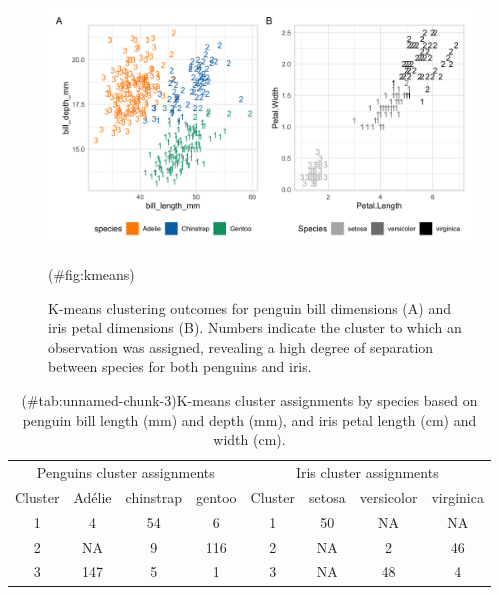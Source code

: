 \begin{Schunk}
\begin{figure}[htbp]

{\centering \includegraphics[width=6in]{fig/kmeans} 

}

\caption[K-means clustering outcomes for penguin bill dimensions (A) and iris petal dimensions (B)]{K-means clustering outcomes for penguin bill dimensions (A) and iris petal dimensions (B). Numbers indicate the cluster to which an observation was assigned, revealing a high degree of separation between species for both penguins and iris.}(\#fig:kmeans)
\end{figure}
\end{Schunk}

\begin{Schunk}
\begin{table}

\caption{(\#tab:unnamed-chunk-3)K-means cluster assignments by species based on penguin bill length (mm) and depth (mm), and iris petal length (cm) and width (cm).}
\centering
\begin{tabular}[t]{c|c|c|c|c|c|c|c}
\hline
\multicolumn{4}{c|}{Penguins cluster assignments} & \multicolumn{4}{c}{Iris cluster assignments} \\
\cline{1-4} \cline{5-8}
Cluster & Adélie & chinstrap & gentoo & Cluster & setosa & versicolor & virginica\\
\hline
1 & 4 & 54 & 6 & 1 & 50 & NA & NA\\
\hline
2 & NA & 9 & 116 & 2 & NA & 2 & 46\\
\hline
3 & 147 & 5 & 1 & 3 & NA & 48 & 4\\
\hline
\end{tabular}
\end{table}

\end{Schunk}

